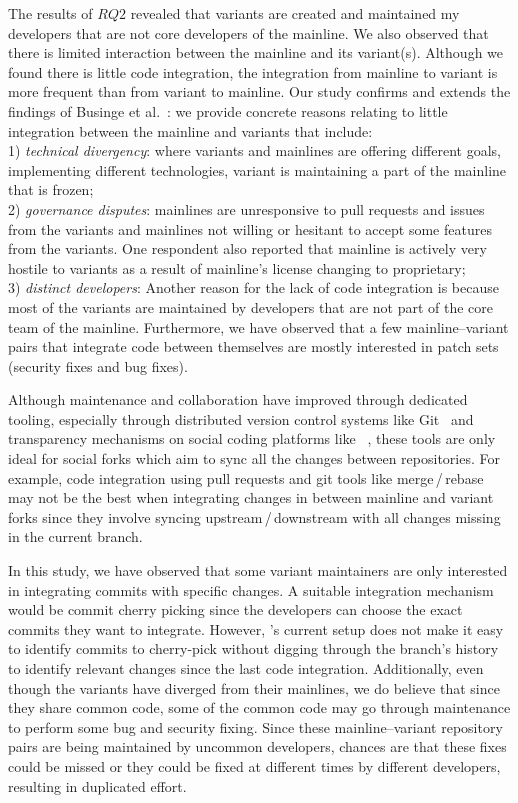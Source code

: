 The results of $RQ2$ revealed that variants are created and maintained my developers that are not core developers of the mainline.
We also observed that there is limited interaction between the mainline and its variant(s).
Although we found there is little code integration, the integration from mainline to variant is more frequent than from variant to  mainline.
Our study confirms and extends the findings of Businge et al.~\cite{businge:emse:2021}: we provide concrete reasons relating to little integration between the mainline and variants that include:\\
1) \textit{technical divergency}: where variants and mainlines are offering different goals, implementing different technologies, variant is maintaining a part of the mainline that is frozen;\\
2) \textit{governance disputes}: mainlines are unresponsive to pull requests and issues from the variants and  mainlines not willing or hesitant to accept some features from the variants. One respondent also reported that mainline is actively very hostile to variants as a result of mainline's license changing to proprietary;\\
3) \textit{distinct developers}: Another reason for the lack of code integration is because most of the variants are maintained by developers that are not part of the core team of the mainline.
Furthermore, we have observed that a few mainline--variant pairs that integrate code between themselves are mostly interested in patch sets (security fixes and bug fixes).

Although maintenance and collaboration have improved through dedicated tooling, especially through distributed version
control systems like Git~\cite{Christian:MSR:2012} and transparency mechanisms on social coding platforms like \gh~\cite{Laura:2012:CSCW}, these tools are only ideal for social forks which aim to sync all the changes between repositories.
For example, code integration using pull requests and \textsf{git} tools like  \textsf{merge\,/\,rebase} may not be the best when integrating changes in between mainline and variant forks since they involve syncing upstream\,/\,downstream with all changes missing in the current branch.

In this study, we have observed that some variant maintainers are only interested in integrating commits with specific changes.
A suitable integration mechanism would be commit cherry picking since the developers can choose the exact commits they want to integrate.
However, \gh's current setup does not make it easy to identify commits to cherry-pick without digging through the branch's history to identify relevant changes since the last code integration.
Additionally, even though the variants have diverged from their mainlines, we do believe that since they share common code, some of the common code may go through maintenance to perform some bug and security fixing.
Since these mainline--variant repository pairs are being maintained by uncommon developers, chances are that these fixes could be missed or they could be fixed at different times by different developers, resulting in duplicated effort.

